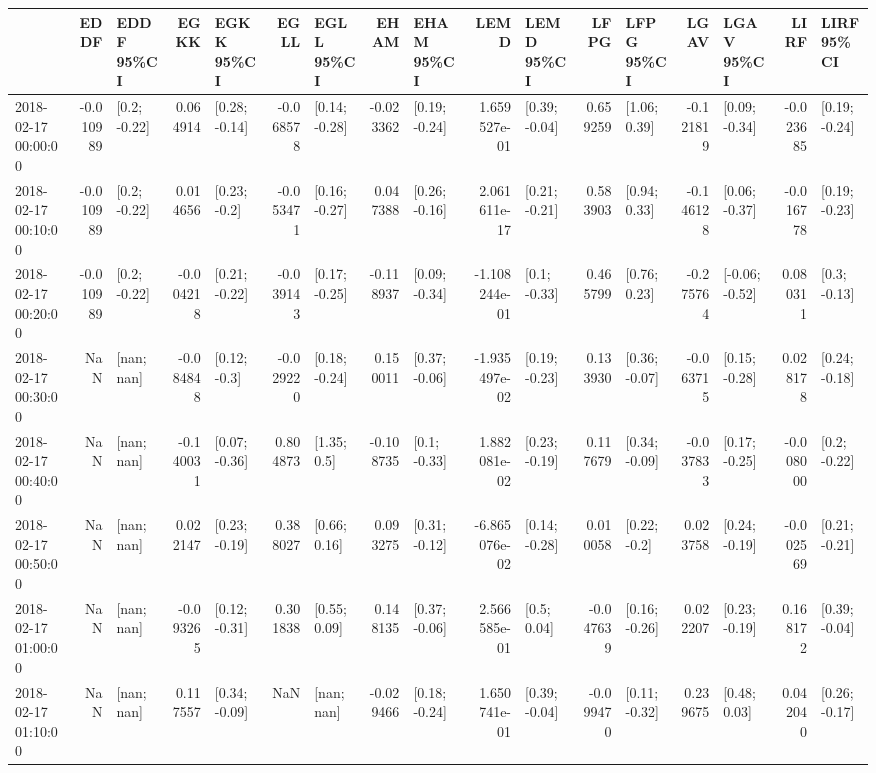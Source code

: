 \begin{tabular}{lrlrlrlrlrlrlrlrl}
\toprule
{} &      EDDF &      EDDF 95\%CI &      EGKK &      EGKK 95\%CI &      EGLL &      EGLL 95\%CI &      EHAM &      EHAM 95\%CI &          LEMD &      LEMD 95\%CI &      LFPG &      LFPG 95\%CI &      LGAV &      LGAV 95\%CI &      LIRF &      LIRF 95\%CI \\
\midrule
2018-02-17 00:00:00 & -0.010989 &    [0.2; -0.22] &  0.064914 &   [0.28; -0.14] & -0.068578 &   [0.14; -0.28] & -0.023362 &   [0.19; -0.24] &  1.659527e-01 &   [0.39; -0.04] &  0.659259 &    [1.06; 0.39] & -0.121819 &   [0.09; -0.34] & -0.023685 &   [0.19; -0.24] \\
2018-02-17 00:10:00 & -0.010989 &    [0.2; -0.22] &  0.014656 &    [0.23; -0.2] & -0.053471 &   [0.16; -0.27] &  0.047388 &   [0.26; -0.16] &  2.061611e-17 &   [0.21; -0.21] &  0.583903 &    [0.94; 0.33] & -0.146128 &   [0.06; -0.37] & -0.016778 &   [0.19; -0.23] \\
2018-02-17 00:20:00 & -0.010989 &    [0.2; -0.22] & -0.004218 &   [0.21; -0.22] & -0.039143 &   [0.17; -0.25] & -0.118937 &   [0.09; -0.34] & -1.108244e-01 &    [0.1; -0.33] &  0.465799 &    [0.76; 0.23] & -0.275764 &  [-0.06; -0.52] &  0.080311 &    [0.3; -0.13] \\
2018-02-17 00:30:00 &       NaN &      [nan; nan] & -0.084848 &    [0.12; -0.3] & -0.029220 &   [0.18; -0.24] &  0.150011 &   [0.37; -0.06] & -1.935497e-02 &   [0.19; -0.23] &  0.133930 &   [0.36; -0.07] & -0.063715 &   [0.15; -0.28] &  0.028178 &   [0.24; -0.18] \\
2018-02-17 00:40:00 &       NaN &      [nan; nan] & -0.140031 &   [0.07; -0.36] &  0.804873 &     [1.35; 0.5] & -0.108735 &    [0.1; -0.33] &  1.882081e-02 &   [0.23; -0.19] &  0.117679 &   [0.34; -0.09] & -0.037833 &   [0.17; -0.25] & -0.008000 &    [0.2; -0.22] \\
2018-02-17 00:50:00 &       NaN &      [nan; nan] &  0.022147 &   [0.23; -0.19] &  0.388027 &    [0.66; 0.16] &  0.093275 &   [0.31; -0.12] & -6.865076e-02 &   [0.14; -0.28] &  0.010058 &    [0.22; -0.2] &  0.023758 &   [0.24; -0.19] & -0.002569 &   [0.21; -0.21] \\
2018-02-17 01:00:00 &       NaN &      [nan; nan] & -0.093265 &   [0.12; -0.31] &  0.301838 &    [0.55; 0.09] &  0.148135 &   [0.37; -0.06] &  2.566585e-01 &     [0.5; 0.04] & -0.047639 &   [0.16; -0.26] &  0.022207 &   [0.23; -0.19] &  0.168172 &   [0.39; -0.04] \\
2018-02-17 01:10:00 &       NaN &      [nan; nan] &  0.117557 &   [0.34; -0.09] &       NaN &      [nan; nan] & -0.029466 &   [0.18; -0.24] &  1.650741e-01 &   [0.39; -0.04] & -0.099470 &   [0.11; -0.32] &  0.239675 &    [0.48; 0.03] &  0.042040 &   [0.26; -0.17] \\

\end{tabular}
